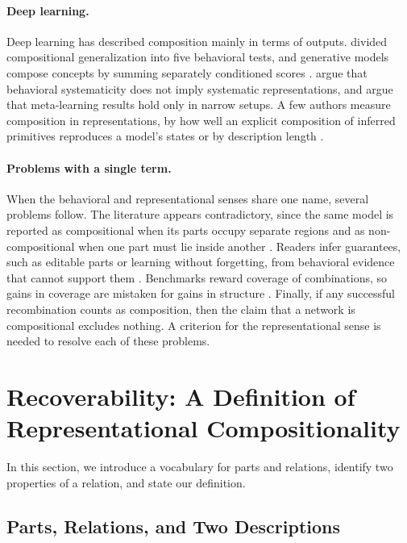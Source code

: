 \documentclass{article}
\theoremstyle{definition}
\theoremstyle{plain}
\theoremstyle{remark}
\begin{document}
\paragraph{Deep learning.} Deep learning has described composition
mainly in terms of outputs. \citet{hupkes2020} divided compositional
generalization into five behavioral tests, and generative models
compose concepts by summing separately conditioned scores
\citep{liu2022composable}. \citet{vegner2025} argue that behavioral
systematicity does not imply systematic representations, and
\citet{woydt2025} argue that meta-learning results \citep{lake2023}
hold only in narrow setups. A few authors measure composition in
representations, by how well an explicit composition of inferred
primitives reproduces a model's states \citep{andreas2019} or by
description length \citep{elmoznino2024,elmoznino2026}.

\paragraph{Problems with a single term.} When the behavioral and
representational senses share one name, several problems follow. The
literature appears contradictory, since the same model is reported as
compositional when its parts occupy separate regions and as
non-compositional when one part must lie inside another
\citep{liu2022composable,conwell2022}. Readers infer guarantees, such as
editable parts or learning without forgetting, from behavioral evidence
that cannot support them \citep{dziri2023,cohen2024}. Benchmarks reward
coverage of combinations, so gains in coverage are mistaken for gains
in structure \citep{kamb2025}. Finally, if any successful recombination
counts as composition, then the claim that a network is compositional
excludes nothing. A criterion for the representational sense is needed
to resolve each of these problems.

\section{Recoverability: A Definition of Representational Compositionality}
\label{sec:definition}

In this section, we introduce a vocabulary for parts and relations,
identify two properties of a relation, and state our definition.

\subsection{Parts, Relations, and Two Descriptions}
\end{document}
